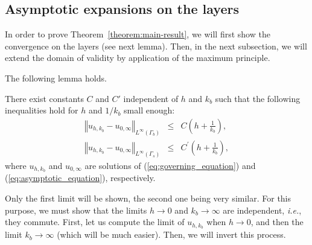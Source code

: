 \subsection{Asymptotic expansions on the layers}

In order to prove Theorem~\ref{theorem:main-result}, we will first
show the convergence on the layers (see next lemma). Then, in the
next subsection, we will extend the domain of validity by
application of the maximum principle.

The following lemma holds. \begin{lemma} There exist constants $C$
and $C'$ independent of $h$ and $k_{b}$ such that the
following inequalities hold for $h$ and $1/k_{b}$ small
enough:
\begin{equation}
\begin{alignedat}{2}\left\Vert u_{h,k_{b}}-u_{0,\infty}\right\Vert _{L^{\infty}(\Gamma_{b})} & \leq & C\left(h+\frac{1}{k_{b}}\right),\\
\left\Vert u_{h,k_{b}}-u_{0,\infty}\right\Vert
_{L^{\infty}(\Gamma_{s})} & \leq & C^\prime
\left(h+\frac{1}{k_{b}}\right),
\end{alignedat}
\label{eq:estimates-layer}
\end{equation}
 where $u_{h,k_{b}}$ and $u_{0,\infty}$ are solutions of (\ref{eq:governing_equation})
and (\ref{eq:asymptotic_equation}), respectively.\end{lemma} \proof
Only the first limit will be shown, the second one being very
similar. For this purpose, we must show that the limits
$h\rightarrow0$ and $k_{b}\rightarrow\infty$ are independent,
\emph{i.e.}, they commute. First, let us compute the limit of
$u_{h,k_{b}}$ when $h\rightarrow0$, and then the limit
$k_{b}\rightarrow\infty$ (which will be much easier). Then, we
will invert this process.


